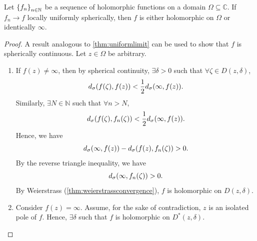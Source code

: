 \begin{proposition}\label{prop:locallyuniformlysphericallyconvergentholomorphicsequenceuniformlimit}
    Let \(\cbraces{f_n}_{n\in\mathbb{N}}\) be a sequence of holomorphic functions on a domain \(\Omega\subseteq\mathbb{C}\). If \(f_n\to f\) locally uniformly spherically, then \(f\) is either holomorphic on \(\Omega\) or identically \(\infty\).
\end{proposition}
\begin{proof}
    A result analogous to \cref{thm:uniformlimit} can be used to show that \(f\) is spherically continuous. Let \(z\in\Omega\) be arbitrary.
    \begin{enumerate}
        \item If \(f(z)\neq\infty\), then by spherical continuity, \(\exists\delta>0\) such that \(\forall\zeta\in D(z,\delta)\), \[d_\sigma\qty(f(\zeta),f(z))<\frac12d_\sigma\qty(\infty, f(z)).\] Similarly, \(\exists N\in\mathbb{N}\) such that \(\forall n>N\), \[d_\sigma\qty(f(\zeta),f_{n}(\zeta))<\frac12d_\sigma\qty(\infty, f(z)).\]
            Hence, we have \[d_\sigma\qty(\infty,f(z))-d_\sigma\qty(f(z),f_{n}(\zeta))>0.\] By the reverse triangle inequality, we have \[d_\sigma\qty(\infty,f_{n}(\zeta))>0.\]
            By Weierstrass (\cref{thm:weierstrassconvergence}), \(f\) is holomorphic on \(D(z,\delta)\).
        \item Consider \(f(z)=\infty\). Assume, for the sake of contradiction, \(z\) is an isolated pole of \(f\). Hence, \(\exists\delta\) such that \(f\) is holomorphic on \(D^*(z,\delta)\).


\end{enumerate}
\end{proof}
